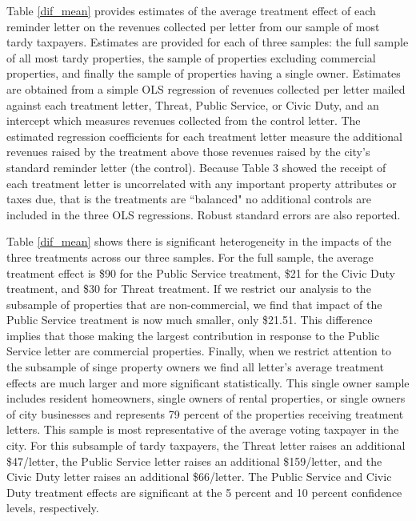 \documentclass[12pt,titlepage]{article}
\begin{document}
Table \ref{dif_mean} provides estimates of the average treatment effect 
of each reminder letter on the revenues collected per letter from 
our sample of most tardy taxpayers.   Estimates are provided for 
each of three samples:  the full sample of all most tardy 
properties, the sample of properties excluding commercial 
properties, and finally the sample of properties having a single 
owner.  Estimates are obtained from a simple OLS regression of 
revenues collected per letter mailed against each treatment 
letter, Threat, Public Service, or Civic Duty, and an intercept 
which measures revenues collected from the control letter.  
The estimated regression coefficients for each treatment letter 
measure the additional revenues raised by the treatment above 
those revenues raised by the city's standard reminder letter 
(the control).  Because Table 3 showed the receipt of each 
treatment letter is uncorrelated with any important property 
attributes or taxes due, that is the treatments are ``balanced"
no additional controls are included in the three OLS regressions.   
Robust standard errors are also reported.   	
	
Table \ref{dif_mean} shows there is significant heterogeneity in the impacts
of the three treatments across our three samples.  For the full
sample, the average treatment effect is \$90 for the Public Service
treatment, \$21 for the Civic Duty treatment, and \$30 for Threat
treatment.  If we restrict our analysis to the subsample of properties
that are non-commercial, we find that impact of the Public Service
treatment is now much smaller, only \$21.51.  This difference implies
that those making the largest contribution in response to the Public
Service letter are commercial properties.  Finally, when we restrict
attention to the subsample of singe property owners we find all
letter's average treatment effects are much larger and more
significant statistically.  This single owner sample includes resident
homeowners, single owners of rental properties, or single owners of
city businesses and represents 79 percent of the properties receiving
treatment letters.  This sample is most representative of the average
voting taxpayer in the city.  For this subsample of tardy taxpayers,
the Threat letter raises an additional \$47/letter, the Public Service
letter raises an additional \$159/letter, and the Civic Duty letter
raises an additional \$66/letter. The Public Service and Civic Duty
treatment effects are significant at the 5 percent and 10 percent
confidence levels, respectively.
\end{document}
